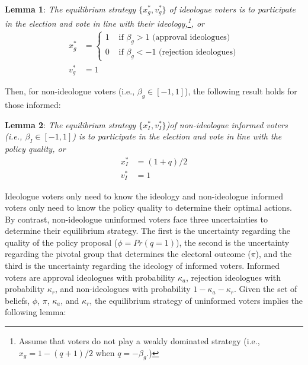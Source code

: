 \documentclass[doc,natbib,12pt]{apa6}
\begin{document}
	\noindent \textbf{Lemma 1}: \textit{The equilibrium strategy $\{x^*_g, v^*_g\}$ of ideologue voters is to participate in the election and vote in line with their ideology,\footnote{Assume that voters do not play a weakly dominated strategy (i.e., $x_g=1-(q+1)/2$ when $q = - \beta_g$.)}, or} 
	\begin{align}
	x^*_g &= \begin{cases}
	1 &\text{ if } \beta_g > 1 \text{ (approval ideologues)}\\
	0 &\text{ if } \beta_g < -1 \text{ (rejection ideologues)}
	\end{cases} \\
	v^*_g &= 1
	\end{align}
	
	\noindent Then, for non-ideologue voters (i.e., $\beta_g \in [-1, 1]$), the following result holds for those informed: 
	
	\noindent \textbf{Lemma 2}: \textit{The equilibrium strategy $\{x^*_I, v^*_I\}$)of non-ideologue informed voters (i.e., $\beta_I \in [-1, 1]$) is to participate in the election and vote in line with the policy quality, or} 
	\begin{align}
	x^*_I &= (1 + q)/2 \\ 
	v^*_I &= 1
	\end{align}
	
	\par Ideologue voters only need to know the ideology and non-ideologue informed voters only need to know the policy quality to determine their optimal actions. By contrast, non-ideologue uninformed voters face three uncertainties to determine their equilibrium strategy. The first is the uncertainty regarding the quality of the policy proposal ($\phi = Pr(q=1)$), the second is the uncertainty regarding the pivotal group that determines the electoral outcome ($\pi$), and the third is the uncertainty regarding the ideology of informed voters. Informed voters are approval ideologues with probability $\kappa_{a}$, rejection ideologues with probability $\kappa_{r}$, and non-ideologues with probability $1 - \kappa_{a} - \kappa_{r}$. Given the set of beliefs, $\phi$, $\pi$, $\kappa_{a}$, and $\kappa_{r}$, the equilibrium strategy of uninformed voters implies the following lemma:
	
\end{document}
